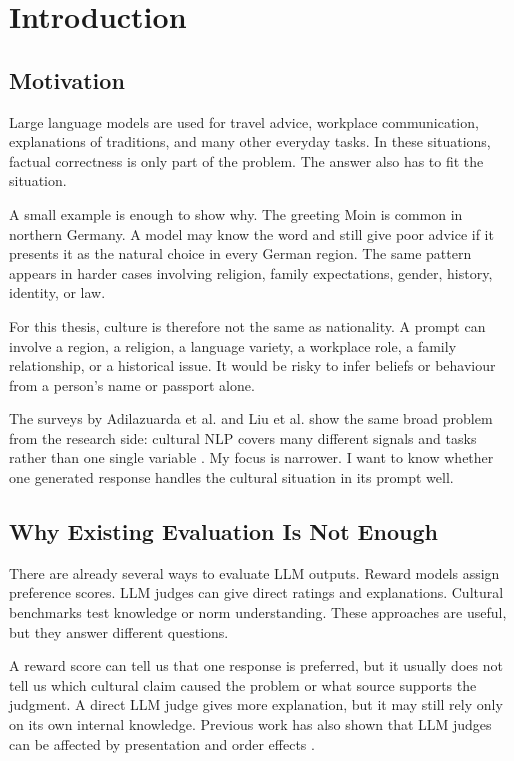 \chapter{Introduction}

\section{Motivation}

Large language models are used for travel advice, workplace communication, explanations of traditions, and many other everyday tasks. In these situations, factual correctness is only part of the problem. The answer also has to fit the situation.

A small example is enough to show why. The greeting Moin is common in northern Germany. A model may know the word and still give poor advice if it presents it as the natural choice in every German region. The same pattern appears in harder cases involving religion, family expectations, gender, history, identity, or law.

For this thesis, culture is therefore not the same as nationality. A prompt can involve a region, a religion, a language variety, a workplace role, a family relationship, or a historical issue. It would be risky to infer beliefs or behaviour from a person's name or passport alone.

The surveys by Adilazuarda et al. and Liu et al. show the same broad problem from the research side: cultural NLP covers many different signals and tasks rather than one single variable \parencite{adilazuarda2024culture,liu2025culturally}. My focus is narrower. I want to know whether one generated response handles the cultural situation in its prompt well.
\section{Why Existing Evaluation Is Not Enough}

There are already several ways to evaluate LLM outputs. Reward models assign preference scores. LLM judges can give direct ratings and explanations. Cultural benchmarks test knowledge or norm understanding. These approaches are useful, but they answer different questions.

A reward score can tell us that one response is preferred, but it usually does not tell us which cultural claim caused the problem or what source supports the judgment. A direct LLM judge gives more explanation, but it may still rely only on its own internal knowledge. Previous work has also shown that LLM judges can be affected by presentation and order effects \parencite{zheng2023judging,wang2024fair}.


